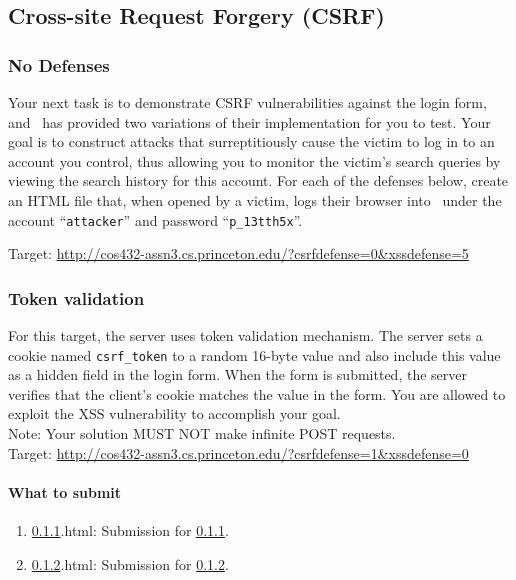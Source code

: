 \documentclass[letterpaper,12pt]{report}
\newcommand{\bungledomain}{http://cos432-assn3.cs.princeton.edu}
\begin{document}
\pagebreak

\subsection{Cross-site Request Forgery (CSRF)}
\label{sec:csrf}

\subsubsection{No Defenses}
\label{sec:csrf_no_defenses}
Your next task is to demonstrate CSRF vulnerabilities against the login form, and \bungle\ has provided two variations of their implementation for you to test.  Your goal is to construct attacks that surreptitiously cause the victim to log in to an account you control, thus allowing you to monitor the victim's search queries by viewing the search history for this account.  For each of the defenses below, create an HTML file that, when opened by a victim, logs their browser into \bungle\ under the account ``\texttt{attacker}'' and password ``\texttt{p\_13tth5x}''.\newline

{Target: \url{\bungledomain/?csrfdefense=0\&xssdefense=5}}

\subsubsection{Token validation}
\label{sec:csrf_tok}
For this target, the server uses token validation mechanism. The server sets a cookie named \texttt{csrf\_token} to a random 16-byte value and also include this value as a hidden field in the login form.  When the form is submitted, the server verifies that the client's cookie matches the value in the form.  You are allowed to exploit the XSS vulnerability to accomplish your goal.\\
Note: Your solution MUST NOT make infinite POST requests.\\

{Target: \url{\bungledomain/?csrfdefense=1\&xssdefense=0}}\\

\paragraph{What to submit} 
\begin{enumerate}
\item {\ref{sec:csrf_no_defenses}.html}: Submission for \ref{sec:csrf_no_defenses}.
\item {\ref{sec:csrf_tok}.html}: Submission for \ref{sec:csrf_tok}.
\end{enumerate}
\end{document}
